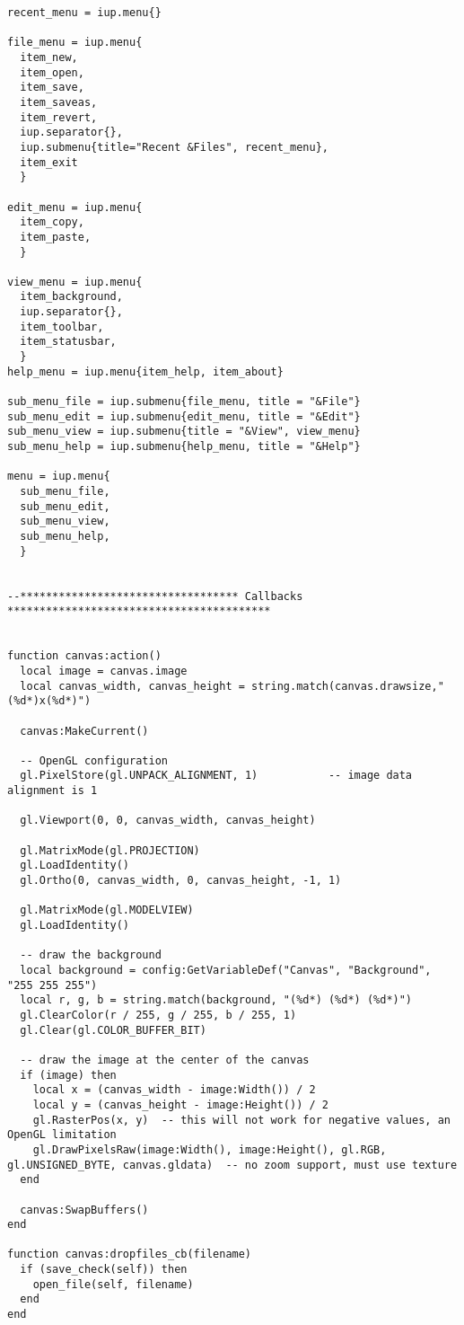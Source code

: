 \documentclass{ctexart}
\begin{document}
\begin{lstlisting}
recent_menu = iup.menu{}

file_menu = iup.menu{
  item_new,
  item_open,
  item_save,
  item_saveas,
  item_revert,
  iup.separator{},
  iup.submenu{title="Recent &Files", recent_menu},
  item_exit
  }

edit_menu = iup.menu{
  item_copy,
  item_paste,
  }

view_menu = iup.menu{
  item_background,
  iup.separator{},
  item_toolbar, 
  item_statusbar, 
  }
help_menu = iup.menu{item_help, item_about}

sub_menu_file = iup.submenu{file_menu, title = "&File"}
sub_menu_edit = iup.submenu{edit_menu, title = "&Edit"}
sub_menu_view = iup.submenu{title = "&View", view_menu}
sub_menu_help = iup.submenu{help_menu, title = "&Help"}

menu = iup.menu{
  sub_menu_file, 
  sub_menu_edit, 
  sub_menu_view, 
  sub_menu_help,
  }


--********************************** Callbacks *****************************************


function canvas:action()
  local image = canvas.image
  local canvas_width, canvas_height = string.match(canvas.drawsize,"(%d*)x(%d*)")

  canvas:MakeCurrent()

  -- OpenGL configuration
  gl.PixelStore(gl.UNPACK_ALIGNMENT, 1)           -- image data alignment is 1

  gl.Viewport(0, 0, canvas_width, canvas_height)

  gl.MatrixMode(gl.PROJECTION)
  gl.LoadIdentity()
  gl.Ortho(0, canvas_width, 0, canvas_height, -1, 1)

  gl.MatrixMode(gl.MODELVIEW)
  gl.LoadIdentity()

  -- draw the background 
  local background = config:GetVariableDef("Canvas", "Background", "255 255 255")
  local r, g, b = string.match(background, "(%d*) (%d*) (%d*)")
  gl.ClearColor(r / 255, g / 255, b / 255, 1)
  gl.Clear(gl.COLOR_BUFFER_BIT)

  -- draw the image at the center of the canvas 
  if (image) then
    local x = (canvas_width - image:Width()) / 2
    local y = (canvas_height - image:Height()) / 2
    gl.RasterPos(x, y)  -- this will not work for negative values, an OpenGL limitation 
    gl.DrawPixelsRaw(image:Width(), image:Height(), gl.RGB, gl.UNSIGNED_BYTE, canvas.gldata)  -- no zoom support, must use texture
  end

  canvas:SwapBuffers()
end

function canvas:dropfiles_cb(filename)
  if (save_check(self)) then
    open_file(self, filename)
  end
end


\end{lstlisting}
\end{document}
